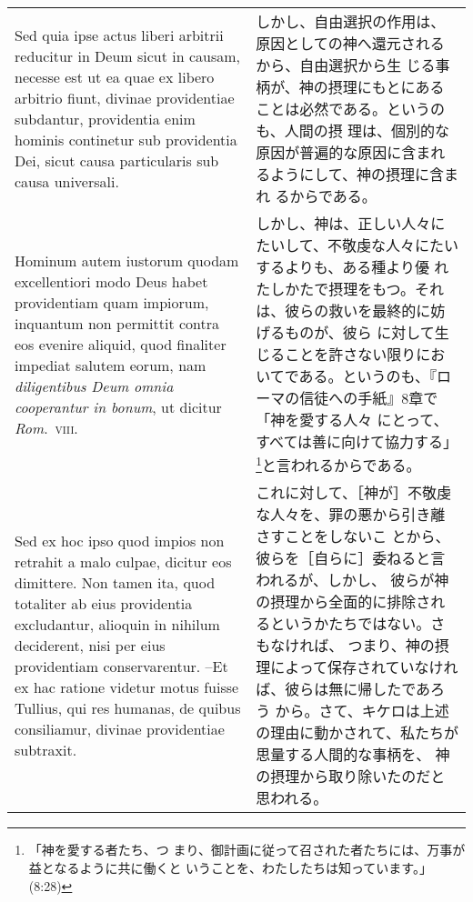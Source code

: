 \documentclass[10pt]{jsarticle} %
\begin{document}
\begin{longtable}{p{21em}p{21em}}
\\


Sed quia ipse actus
liberi arbitrii reducitur in Deum sicut in causam, necesse est ut ea
quae ex libero arbitrio fiunt, divinae providentiae subdantur,
providentia enim hominis continetur sub providentia Dei, sicut causa
particularis sub causa universali. 

&

しかし、自由選択の作用は、原因としての神へ還元されるから、自由選択から生
 じる事柄が、神の摂理にもとにあることは必然である。というのも、人間の摂
 理は、個別的な原因が普遍的な原因に含まれるようにして、神の摂理に含まれ
 るからである。



\\



Hominum autem iustorum quodam
excellentiori modo Deus habet providentiam quam impiorum, inquantum non
permittit contra eos evenire aliquid, quod finaliter impediat salutem
eorum, nam {\itshape diligentibus Deum omnia cooperantur in bonum}, ut dicitur
{\itshape Rom}.~{\scshape viii}. 

&

しかし、神は、正しい人々にたいして、不敬虔な人々にたいするよりも、ある種より優
 れたしかたで摂理をもつ。それは、彼らの救いを最終的に妨げるものが、彼ら
 に対して生じることを許さない限りにおいてである。というのも、『ローマの信徒への手紙』8章で「神を愛する人々
 にとって、すべては善に向けて協力する」\footnote{「神を愛する者たち、つ
 まり、御計画に従って召された者たちには、万事が益となるように共に働くと
 いうことを、わたしたちは知っています。」(8:28)}と言われるからである。

\\


Sed ex hoc ipso quod impios non retrahit a malo culpae,
dicitur eos dimittere. 
Non tamen ita, quod totaliter ab eius providentia
excludantur, alioquin in nihilum deciderent, nisi per eius providentiam
conservarentur. --Et ex hac ratione videtur motus fuisse Tullius, qui res
humanas, de quibus consiliamur, divinae providentiae subtraxit.


&

これに対して、［神が］不敬虔な人々を、罪の悪から引き離さすことをしないこ
 とから、彼らを［自らに］委ねると言われるが、しかし、
彼らが神の摂理から全面的に排除されるというかたちではない。さもなければ、
 つまり、神の摂理によって保存されていなければ、彼らは無に帰したであろう
 から。さて、キケロは上述の理由に動かされて、私たちが思量する人間的な事柄を、
 神の摂理から取り除いたのだと思われる。



\end{longtable}
\end{document}
